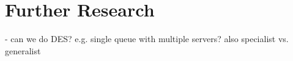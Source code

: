 \section{Further Research}
	- can we do DES? e.g. single queue with multiple servers? also specialist vs. generalist